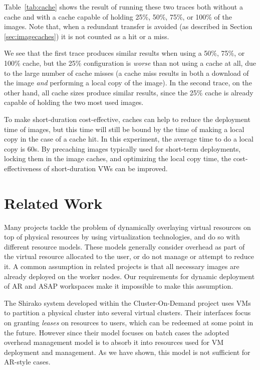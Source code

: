 \documentclass[singlespace]{ccw_chithesis}
\begin{document}
Table~\ref{tab:cache} shows the result of running these two traces both without a
cache and with a cache capable of holding 25\%, 50\%, 75\%, or 100\% of
the images. Note that, when a redundant transfer is avoided (as
described in Section \ref{sec:imagecaches}) it is not counted as a hit or a miss.

We see that the first trace produces similar results when using a 50\%,
75\%, or 100\% cache, but the 25\% configuration is \emph{worse} than
not using a cache at all, due to the large number of cache misses (a
cache miss results in both a download of the image \emph{and}
performing a local copy of the image). In the second trace, on the
other hand, all cache sizes produce similar results, since the 25\%
cache is already capable of holding the two most used images.

To make short{}-duration cost{}-effective, caches can help to reduce the
deployment time of images, but this time will still be bound by the
time of making a local copy in the case of a cache hit. In this
experiment, the average time to do a local copy is 60s. By precaching
images typically used for short{}-term deployments, locking them in the
image caches, and optimizing the local copy time, the
cost{}-effectiveness of short{}-duration VWs can be improved.

\chapter{Related Work}
\label{cha:related}

Many projects tackle the problem of dynamically overlaying virtual
resources on top of physical resources by using virtualization
technologies, and do so with different resource models. These models
generally consider overhead as part of the virtual resource allocated
to the user, or do not manage or attempt to reduce it. A common
assumption in related projects is that all necessary images are already
deployed on the worker nodes. Our requirements for dynamic deployment
of AR and ASAP workspaces make it impossible to make this assumption.

The Shirako system \cite{BorjaCite12} developed within the Cluster{}-On{}-Demand
project \cite{BorjaCite10, codweb} uses VMs to partition a physical cluster into several
virtual clusters. Their interfaces focus on granting \emph{leases} on
resources to users, which can be redeemed at some point in the future.
However since their model focuses on batch cases the adopted overhead
management model is to absorb it into resources used for VM deployment
and management. As we have shown, this model is not sufficient for
AR{}-style cases.
\end{document}
